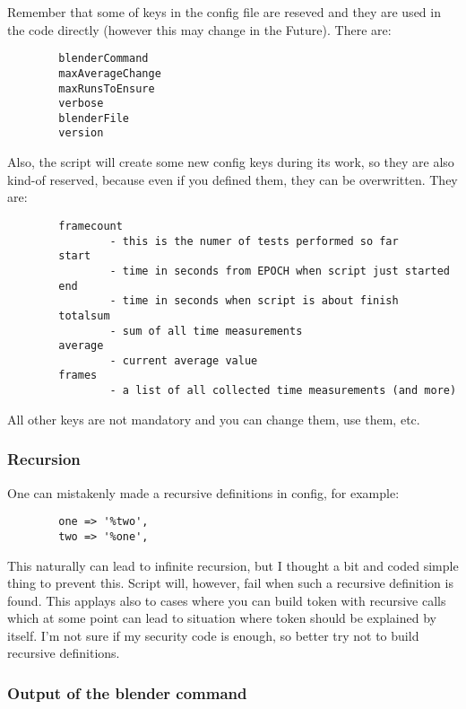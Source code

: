 \documentclass{article}
\begin{document}
Remember that some of keys in the config file are reseved and they are used in
the code directly (however this may change in the Future). There are:

\begin{verbatim}
        blenderCommand
        maxAverageChange
        maxRunsToEnsure
        verbose
        blenderFile
        version
\end{verbatim}


Also, the script will create some new config keys during its work, so they are
also kind-of reserved, because even if you defined them, they can be
overwritten. They are:

\begin{verbatim}
        framecount
                - this is the numer of tests performed so far
        start
                - time in seconds from EPOCH when script just started
        end
                - time in seconds when script is about finish
        totalsum
                - sum of all time measurements
        average
                - current average value
        frames
                - a list of all collected time measurements (and more)
\end{verbatim}


All other keys are not mandatory and you can change them, use them, etc.

\subsubsection*{Recursion\label{Recursion}}


One can mistakenly made a recursive definitions in config, for example:

\begin{verbatim}
        one => '%two',
        two => '%one',
\end{verbatim}


This naturally can lead to infinite recursion, but I thought a bit and coded
simple thing to prevent this. Script will, however, fail when such a recursive
definition is found. This applays also to cases where you can build token with
recursive calls which at some point can lead to situation where token should be
explained by itself. I'm not sure if my security code is enough, so better try
not to build recursive definitions.

\subsubsection*{Output of the blender command\label{Output_of_the_blender_command}}
\end{document}

